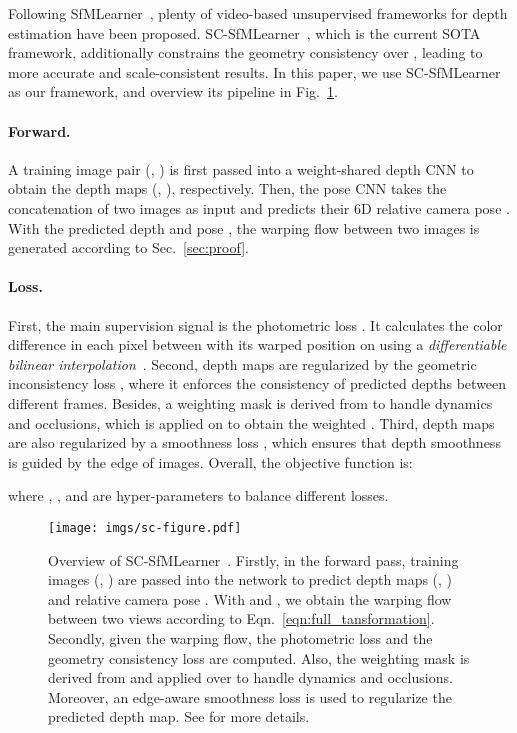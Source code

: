\documentclass{article}
\newcommand{\figref}[1]{Fig.~\ref{#1}}
\newcommand{\equref}[1]{Eqn.~\ref{#1}}
\newcommand{\secref}[1]{Sec.~\ref{#1}}
\begin{document}
Following SfMLearner~\cite{zhou2017unsupervised}, plenty of video-based unsupervised frameworks for depth estimation have been proposed. SC-SfMLearner~\cite{bian2019depth}, which is the current SOTA framework, additionally constrains the geometry consistency over \cite{zhou2017unsupervised},
leading to more accurate and scale-consistent results.
In this paper, we use SC-SfMLearner as our framework,
and overview its pipeline in \figref{fig:sc-overview}.

\paragraph{Forward.}
A training image pair (, ) is first passed into
a weight-shared depth CNN to obtain the depth maps (, ), respectively.
Then, the pose CNN takes the concatenation of two images as input and predicts their 6D relative camera pose .
With the predicted depth  and pose ,
the warping flow between two images is generated according to \secref{sec:proof}.


\paragraph{Loss.}
First, the main supervision signal is the photometric loss .
It calculates the color difference in each pixel between  with its warped position on  using a \emph{differentiable bilinear interpolation}~\cite{jaderberg2015stn}.
Second, depth maps are regularized by the geometric inconsistency loss , where it enforces the consistency of predicted depths between different frames.
Besides, a weighting mask  is derived from  to handle dynamics and occlusions, which is applied on  to obtain the weighted .
Third, depth maps are also regularized by a smoothness loss ,
which ensures that depth smoothness is guided by the edge of images.
Overall, the objective function is:

where , , and  are hyper-parameters to balance different losses. 


\begin{figure}[t]
\centering
\texttt{[image: imgs/sc-figure.pdf]} 
\caption{Overview of SC-SfMLearner~\cite{bian2019depth}.
Firstly, in the forward pass, training images (, ) are passed into the network to predict depth maps (, ) and relative camera pose .
With  and , we obtain the warping flow between two views according to \equref{eqn:full_tansformation}.
Secondly, given the warping flow, the photometric loss  and the geometry consistency loss  are computed.
Also, the weighting mask  is derived from  and applied over  to handle dynamics and occlusions.
Moreover, an edge-aware smoothness loss  is used to regularize the predicted depth map.
See \cite{bian2019depth} for more details.
}
\label{fig:sc-overview}
\end{figure}
\end{document}
